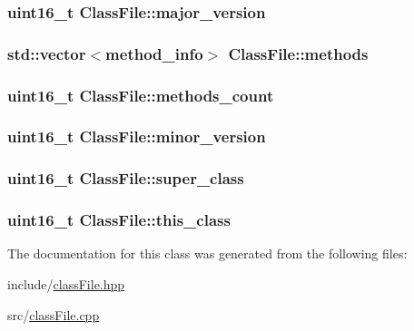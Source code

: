 \hypertarget{classClassFile_a931ebda6a22c18e009891d40016b2790}{
\subsubsection[{major\+\_\+version}]{\setlength{\rightskip}{0pt plus 5cm}uint16\+\_\+t Class\+File\+::major\+\_\+version}}\label{classClassFile_a931ebda6a22c18e009891d40016b2790}
\hypertarget{classClassFile_ab1f087a706ccd7f5334bd17ed4d05936}{
\subsubsection[{methods}]{\setlength{\rightskip}{0pt plus 5cm}std\+::vector$<${\bf method\+\_\+info}$>$ Class\+File\+::methods}}\label{classClassFile_ab1f087a706ccd7f5334bd17ed4d05936}
\hypertarget{classClassFile_a479310e3e0674d9171d24beb794fcb14}{
\subsubsection[{methods\+\_\+count}]{\setlength{\rightskip}{0pt plus 5cm}uint16\+\_\+t Class\+File\+::methods\+\_\+count}}\label{classClassFile_a479310e3e0674d9171d24beb794fcb14}
\hypertarget{classClassFile_a357116b538d1b1ef11073560eba9396d}{
\subsubsection[{minor\+\_\+version}]{\setlength{\rightskip}{0pt plus 5cm}uint16\+\_\+t Class\+File\+::minor\+\_\+version}}\label{classClassFile_a357116b538d1b1ef11073560eba9396d}
\hypertarget{classClassFile_aa48f683b6e5b60021410f88a5e831cbe}{
\subsubsection[{super\+\_\+class}]{\setlength{\rightskip}{0pt plus 5cm}uint16\+\_\+t Class\+File\+::super\+\_\+class}}\label{classClassFile_aa48f683b6e5b60021410f88a5e831cbe}
\hypertarget{classClassFile_aa45abc9545fe11fca252d9769b665294}{
\subsubsection[{this\+\_\+class}]{\setlength{\rightskip}{0pt plus 5cm}uint16\+\_\+t Class\+File\+::this\+\_\+class}}\label{classClassFile_aa45abc9545fe11fca252d9769b665294}


The documentation for this class was generated from the following files\+:\begin{DoxyCompactItemize}
\item 
include/\hyperlink{classFile_8hpp}{class\+File.\+hpp}\item 
src/\hyperlink{classFile_8cpp}{class\+File.\+cpp}\end{DoxyCompactItemize}
